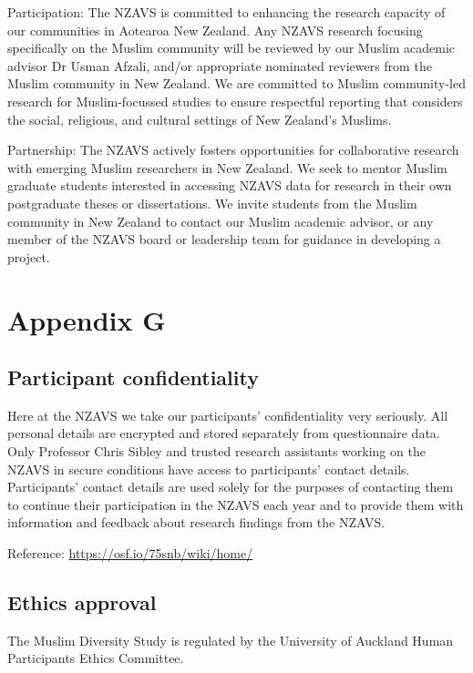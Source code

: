 \documentclass[
]{interact}
\begin{document}
\noindent Participation: The NZAVS is committed to enhancing the
research capacity of our communities in Aotearoa New Zealand. Any NZAVS
research focusing specifically on the Muslim community will be reviewed
by our Muslim academic advisor Dr Usman Afzali, and/or appropriate
nominated reviewers from the Muslim community in New Zealand. We are
committed to Muslim community-led research for Muslim-focussed studies
to ensure respectful reporting that considers the social, religious, and
cultural settings of New Zealand's Muslims.

\noindent Partnership: The NZAVS actively fosters opportunities for
collaborative research with emerging Muslim researchers in New Zealand.
We seek to mentor Muslim graduate students interested in accessing NZAVS
data for research in their own postgraduate theses or dissertations. We
invite students from the Muslim community in New Zealand to contact our
Muslim academic advisor, or any member of the NZAVS board or leadership
team for guidance in developing a project.

\newpage{}

\section{Appendix G}\label{appendix-g}

\subsection{Participant
confidentiality}\label{participant-confidentiality}

\noindent Here at the NZAVS we take our participants' confidentiality
very seriously. All personal details are encrypted and stored separately
from questionnaire data. Only Professor Chris Sibley and trusted
research assistants working on the NZAVS in secure conditions have
access to participants' contact details. Participants' contact details
are used solely for the purposes of contacting them to continue their
participation in the NZAVS each year and to provide them with
information and feedback about research findings from the NZAVS.

\noindent Reference: \url{https://osf.io/75snb/wiki/home/}

\subsection{Ethics approval}\label{ethics-approval}

\noindent The Muslim Diversity Study is regulated by the University of
Auckland Human Participants Ethics Committee.
\end{document}
